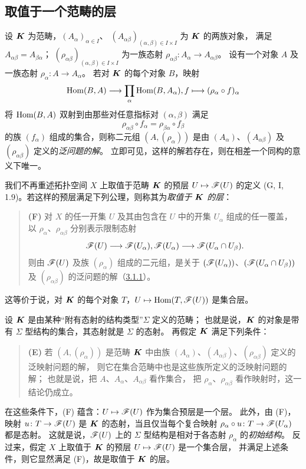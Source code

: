 \subsection{取值于一个范畴的层}\hypertarget{heading:0:3.1}{}

设 $\boldsymbol K$ 为范畴，$(A_\alpha)_{\alpha\in I}$、
$(A_{\alpha\beta})_{(\alpha,\beta)\in I\times I}$ 为 $\boldsymbol K$ 的两族对象，
满足 $A_{\alpha\beta}=A_{\beta\alpha}$；
$(\rho_{\alpha\beta})_{(\alpha,\beta)\in I\times I}$ 为一族态射
$\rho_{\alpha\beta}\colon A_\alpha\to A_{\alpha\beta}$。
设有一个对象 $A$ 及一族态射 $\rho_\alpha\colon A\to A_\alpha$。
若对 $\boldsymbol K$ 的每个对象 $B$，映射
\[
 \operatorname{Hom}(B,A)\longrightarrow\prod_\alpha\operatorname{Hom}(B,A_\alpha),
  f\longmapsto(\rho_\alpha\circ f)_\alpha
\]
将 $\operatorname{Hom}(B,A)$ 双射到由那些对任意指标对 $(\alpha,\beta)$ 满足
\[
 \rho_{\alpha\beta}\circ f_\alpha
 =\rho_{\beta\alpha}\circ f_\beta
\]
的族 $(f_\alpha)$ 组成的集合，则称二元组 $(A,(\rho_\alpha))$ 是由
$(A_\alpha)$、$(A_{\alpha\beta})$ 及 $(\rho_{\alpha\beta})$ 定义的\emph{泛问题的解}。
立即可见，这样的解若存在，则在相差一个同构的意义下唯一。

我们不再重述拓扑空间 $X$ 上取值于范畴 $\boldsymbol K$ 的预层 $U\mapsto\mathscr F(U)$ 的定义
(G, I, 1.9)。若这样的预层满足下列公理，则称其为\emph{取值于 $\boldsymbol K$ 的层}：
\begin{quote}
\textbf{(F)} 对 $X$ 的任一开集 $U$ 及其由包含在 $U$ 中的开集 $U_\alpha$ 组成的任一覆盖，
以 $\rho_\alpha$、$\rho_{\alpha\beta}$ 分别表示限制态射
\[
 \F(U)\longrightarrow\F(U_\alpha),
 \qquad
 \F(U_\alpha)\longrightarrow\F(U_\alpha\cap U_\beta).
\]
则由 $\mathscr F(U)$ 及族 $(\rho_\alpha)$ 组成的二元组，是关于
$(\mathscr F(U_\alpha))$、$(\mathscr F(U_\alpha\cap U_\beta))$ 及 $(\rho_{\alpha\beta})$
的泛问题的解（\hyperlink{para:0:3.1.1}{3.1.1}）。
\end{quote}
这等价于说，对 $\boldsymbol K$ 的每个对象 $T$，$U\mapsto\operatorname{Hom}(T,\mathscr F(U))$ 是集合层。

设 $\boldsymbol K$ 是由某种“附有态射的结构类型”$\Sigma$ 定义的范畴；
也就是说，$\boldsymbol K$ 的对象是带有 $\Sigma$ 型结构的集合，其态射就是 $\Sigma$ 的态射。
再假定 $\boldsymbol K$ 满足下列条件：
\begin{quote}
\textbf{(E)} 若 $(A,(\rho_\alpha))$ 是范畴 $\boldsymbol K$ 中由族
$(A_\alpha)$、$(A_{\alpha\beta})$、$(\rho_{\alpha\beta})$ 定义的泛映射问题的解，
则它在集合范畴中也是这些族所定义的泛映射问题的解；
也就是说，把 $A$、$A_\alpha$、$A_{\alpha\beta}$ 看作集合，
把 $\rho_\alpha$、$\rho_{\alpha\beta}$ 看作映射时，这一结论仍成立。
\end{quote}
在这些条件下，(F) 蕴含：$U\mapsto\mathscr F(U)$ 作为集合预层是一个层。
此外，由 (F)，映射 $u\colon T\to\mathscr F(U)$ 是 $\boldsymbol K$ 的态射，当且仅当每个复合映射
$\rho_\alpha\circ u\colon T\to\mathscr F(U_\alpha)$ 都是态射。
这就是说，$\mathscr F(U)$ 上的 $\Sigma$ 型结构是相对于各态射 $\rho_\alpha$ 的\emph{初始结构}。
反过来，假定 $X$ 上取值于 $\boldsymbol K$ 的预层 $U\mapsto\mathscr F(U)$ 是一个集合层，
并满足上述条件，则它显然满足 (F)，故是取值于 $\boldsymbol K$ 的层。

